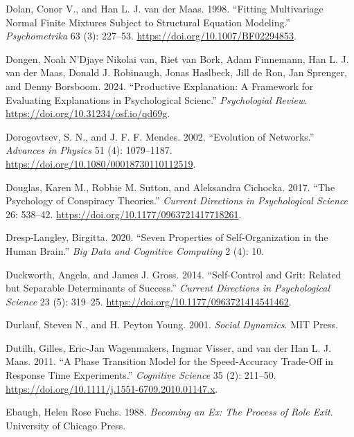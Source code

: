 \documentclass[
  a4paper,
  DIV=11,
  numbers=noendperiod,
  oneside]{scrreprt}
\newlength{\cslhangindent}
\newenvironment{CSLReferences}[2] %
 {\begin{list}{}{%
  \setlength{\itemindent}{0pt}
  \setlength{\leftmargin}{0pt}
  \setlength{\parsep}{0pt}
  \ifodd #1
   \setlength{\leftmargin}{\cslhangindent}
   \setlength{\itemindent}{-1\cslhangindent}
  \fi
  \setlength{\itemsep}{#2\baselineskip}}}
 {\end{list}}
\begin{document}
\begin{CSLReferences}{1}{0}
Dolan, Conor V., and Han L. J. van der Maas. 1998. {``Fitting
Multivariage Normal Finite Mixtures Subject to Structural Equation
Modeling.''} \emph{Psychometrika} 63 (3): 227--53.
\url{https://doi.org/10.1007/BF02294853}.

Dongen, Noah N'Djaye Nikolai van, Riet van Bork, Adam Finnemann, Han L.
J. van der Maas, Donald J. Robinaugh, Jonas Haslbeck, Jill de Ron, Jan
Sprenger, and Denny Borsboom. 2024. {``Productive Explanation: A
Framework for Evaluating Explanations in Psychological Scienc.''}
\emph{Psychologial Review}. \url{https://doi.org/10.31234/osf.io/qd69g}.

Dorogovtsev, S. N., and J. F. F. Mendes. 2002. {``Evolution of
Networks.''} \emph{Advances in Physics} 51 (4): 1079--1187.
\url{https://doi.org/10.1080/00018730110112519}.

Douglas, Karen M., Robbie M. Sutton, and Aleksandra Cichocka. 2017.
{``The Psychology of Conspiracy Theories.''} \emph{Current Directions in
Psychological Science} 26: 538--42.
\url{https://doi.org/10.1177/0963721417718261}.

Dresp-Langley, Birgitta. 2020. {``Seven {Properties} of
{Self-Organization} in the {Human Brain}.''} \emph{Big Data and
Cognitive Computing} 2 (4): 10.

Duckworth, Angela, and James J. Gross. 2014. {``Self-Control and Grit:
Related but Separable Determinants of Success.''} \emph{Current
Directions in Psychological Science} 23 (5): 319--25.
\url{https://doi.org/10.1177/0963721414541462}.

Durlauf, Steven N., and H. Peyton Young. 2001. \emph{Social {Dynamics}}.
{MIT Press}.

Dutilh, Gilles, Eric-Jan Wagenmakers, Ingmar Visser, and van der Han L.
J. Maas. 2011. {``A {Phase Transition Model} for the {Speed-Accuracy
Trade-Off} in {Response Time Experiments}.''} \emph{Cognitive Science}
35 (2): 211--50. \url{https://doi.org/10.1111/j.1551-6709.2010.01147.x}.

Ebaugh, Helen Rose Fuchs. 1988. \emph{Becoming an Ex: The Process of
Role Exit}. University of Chicago Press.


\end{CSLReferences}
\end{document}
